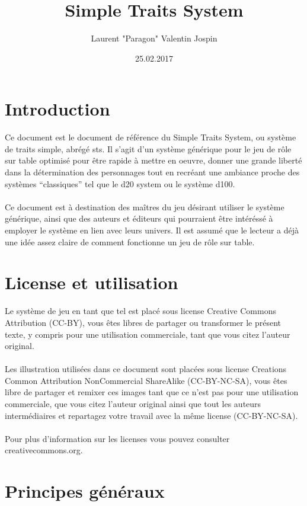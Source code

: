 \documentclass[a4paper,10pt,twoside,twocolumn]{article}
\author{Laurent "Paragon" Valentin Jospin}
\title{Simple Traits System}
\date{25.02.2017}
\begin{document}
  \maketitle
 
 \section{Introduction}
 
 Ce document est le document de référence du Simple Traits System, ou système de traits simple, abrégé sts. Il s'agit d'un système générique pour le jeu de rôle sur table optimisé pour être rapide à mettre en oeuvre, donner une grande liberté dans la détermination des personnages tout en recréant une ambiance proche des systèmes ``classiques'' tel que le d20 system ou le système d100.\\
 \\
 Ce document est à destination des maîtres du jeu désirant utiliser le système générique, ainsi que des auteurs et éditeurs qui pourraient être intéréssé à employer le système en lien avec leurs univers. Il est assumé que le lecteur a déjà une idée assez claire de comment fonctionne un jeu de rôle sur table.
 
 \section{License et utilisation}
 
 Le système de jeu en tant que tel est placé sous license Creative Commons Attribution (CC-BY), vous êtes libres de partager ou transformer le présent texte, y compris pour une utilisation commerciale, tant que vous citez l'auteur original.\\
 \\
 Les illustration utilisées dans ce document sont placées sous license Creations Common Attribution NonCommercial ShareAlike (CC-BY-NC-SA), vous êtes libre de partager et remixer ces images tant que ce n'est pas pour une utilisation commerciale, que vous citez l'auteur original ainsi que tout les auteurs intermédiaires et repartagez votre travail avec la même license (CC-BY-NC-SA).\\
 \\
 Pour plus d'information sur les licenses vous pouvez consulter creativecommons.org.
 
 \section{Principes généraux}
 
\end{document}

